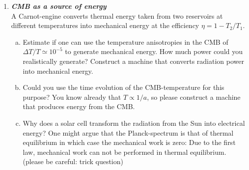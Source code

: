 \documentclass[a4paper,12pt]{article}
\newcommand{\question}[1]{\textbf{\textit{#1}}}
\begin{document}
\begin{enumerate}
\item \question{CMB as a source of energy}\\
A Carnot-engine converts thermal energy taken from two reservoirs at different temperatures into mechanical energy at the efficiency $\eta = 1-T_2/T_1$.
\begin{enumerate}[(a)]
\item{Estimate if one can use the temperature anisotropies in the CMB of $\Delta T/T\simeq 10^{-5}$ to generate mechanical energy. How much power could you realistically generate? Construct a machine that converts radiation power into mechanical energy.}
\item{Could you use the time evolution of the CMB-temperature for this purpose? You know already that $T\propto 1/a$, so please construct a machine that produces energy from the CMB.}
\item{Why does a solar cell transform the radiation from the Sun into electrical energy? One might argue that the Planck-spectrum is that of thermal equilibrium in which case the mechanical work is zero: Due to the first law, mechanical work can not be performed in thermal equilibrium. (please be careful: trick question)}
\end{enumerate}

\end{enumerate}
\end{document}
